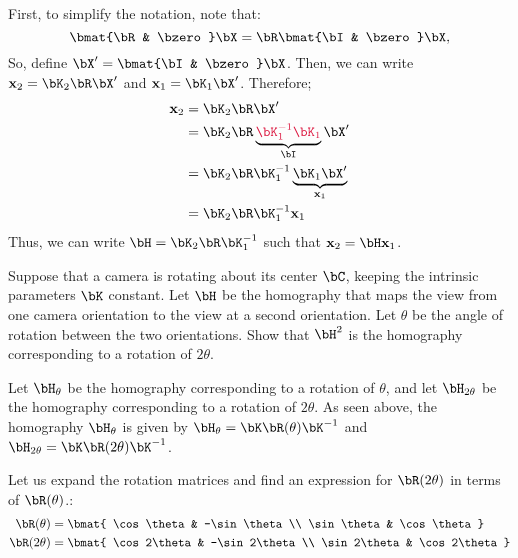 \begin{problem}
\begin{enumroman}
      \begin{answer}
        First, to simplify the notation, note that:
        \[ \bmat{\bR & \bzero} \bX = \bR \bmat{\bI & \bzero} \bX, \]
        So, define $\bX' = \bmat{\bI & \bzero} \bX$.
        Then, we can write $\bx_2 = \bK_2 \bR \bX'$ and $\bx_1 = \bK_1 \bX'$.
        Therefore;
        \begin{align*}
          \bx_2 &= \bK_2 \bR \bX' \\
                &= \bK_2 \bR \underbrace{\crim{\bK_1^{-1} \bK_1}}_{\bI} \bX' \\
                &= \bK_2 \bR \bK_1^{-1} \underbrace{\bK_1 \bX'}_{\bx_1} \\
                &= \bK_2 \bR \bK_1^{-1} \bx_1
        \end{align*}
        Thus, we can write $\bH = \bK_2 \bR \bK_1^{-1}$
        such that $\bx_2 = \bH \bx_1$.

      \end{answer}

    \newpage
    \item Suppose that a camera is rotating about its center $\bC$,
      keeping the intrinsic parameters $\bK$ constant.
      Let $\bH$ be the homography that maps the view from one camera orientation
      to the view at a second orientation.
      Let $\theta$ be the angle of rotation between the two orientations.
      Show that $\bH^2$ is the homography corresponding to a rotation of $2\theta$.

      \begin{answer}
        Let $\bH_\theta$ be the homography corresponding to a rotation of $\theta$,
        and let $\bH_{2\theta}$ be the homography corresponding to a rotation of $2\theta$.
        As seen above, the homography $\bH_\theta$ is given by $\bH_\theta = \bK \bR(\theta) \bK^{-1}$
        and $\bH_{2\theta} = \bK \bR(2\theta) \bK^{-1}$.

        Let us expand the rotation matrices and find an expression
        for $\bR(2\theta)$ in terms of $\bR(\theta)$.:
        \begin{align*}
          \bR(\theta) &= \bmat{
            \cos \theta & -\sin \theta \\
            \sin \theta & \cos \theta
          } \\
          \bR(2\theta) &= \bmat{
            \cos 2\theta & -\sin 2\theta \\
            \sin 2\theta & \cos 2\theta
          }
        \end{align*}


\end{answer}
\end{enumroman}
\end{problem}
